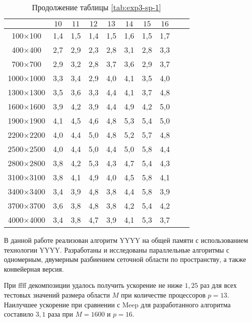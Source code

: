 \documentclass[14pt,a4paper]{extarticle} %
\begin{document}
\begin{table}[h!] 
\captionsetup{labelformat = empty}
\caption{Продолжение таблицы \ref{tab:exp3-sp-1}}
\centering
 \begin{tabular}{|c|c|c|c|c|c|c|c|c|c|}\hline
               &$10$ &$11$&$12$&$13$&$14$ &$15$ &$16$   \\ \hline
100$\times$100   &1,4 &1,5 &1,4 &1,5 &1,6 &1,5 &1,7 \\ \hline
400$\times$400   &2,7 &2,9 &2,3 &2,8 &3,1 &2,8 &3,3 \\ \hline
700$\times$700   &2,9 &3,2 &2,8 &3,7 &3,6 &2,9 &3,7 \\ \hline
1000$\times$1000 &3,3 &3,4 &2,9 &4,0 &4,1 &3,5 &4,0 \\ \hline
1300$\times$1300 &3,5 &3,6 &3,3 &4,4 &4,1 &3,7 &4,8 \\ \hline
1600$\times$1600 &3,9 &4,2 &3,9 &4,4 &4,9 &4,2 &5,0 \\ \hline
1900$\times$1900 &4,1 &4,5 &4,6 &4,8 &5,3 &5,4 &5,0 \\ \hline
2200$\times$2200 &4,0 &4,4 &5,0 &4,8 &5,2 &5,7 &4,8 \\ \hline
2500$\times$2500 &4,0 &4,4 &5,0 &4,4 &5,0 &5,8 &4,4 \\ \hline
2800$\times$2800 &3,8 &4,2 &5,3 &4,3 &4,7 &5,4 &4,3 \\ \hline
3100$\times$3100 &3,8 &4,1 &4,9 &4,0 &4,5 &5,8 &4,1 \\ \hline
3400$\times$3400 &3,4 &3,9 &4,8 &3,8 &4,4 &5,8 &3,9 \\ \hline
3700$\times$3700 &3,6 &3,8 &4,8 &3,8 &4,2 &5,4 &4,2 \\ \hline
4000$\times$4000 &3,4 &3,8 &4,7 &3,9 &4,1 &5,3 &3,7 \\ \hline            	
 \end{tabular}
\label{tab:exp3-sp-2}
\addtocounter{table}{-1}
\end{table}

\conclusiontitle

В данной работе реализован алгоритм YYYY на общей памяти с использованием технологии YYYY. Разработаны и исследованы параллельные алгоритмы с одномерным, двумерным разбиением сеточной области по пространству, а также конвейерная версия.

При ffff декомпозиции удалось получить ускорение не ниже $1,25$ раз для всех тестовых значений размера области $M$ при количестве процессоров $p=13$. Наилучшее ускорение при сравнении с Meep для разработанного алгоритма составило $3,1$ раза при $M=1600$ и $p=16$.
\end{document}
